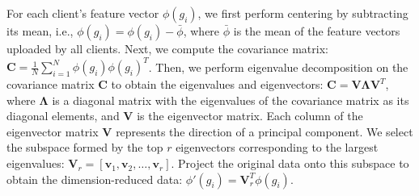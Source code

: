 \documentclass[conference]{IEEEtran}
\begin{document}
















For each client's feature vector $\phi(g_i)$, we first perform centering by subtracting its mean, i.e., $\phi(g_i) = \phi(g_i) - \bar{\phi}$, where $\bar{\phi}$ is the mean of the feature vectors uploaded by all clients. Next, we compute the covariance matrix: $\mathbf{C} = \frac{1}{N} \sum_{i=1}^N \phi(g_i) \phi(g_i)^T$. Then, we perform eigenvalue decomposition on the covariance matrix $\mathbf{C}$ to obtain the eigenvalues and eigenvectors: $\mathbf{C} = \mathbf{V} \mathbf{\Lambda} \mathbf{V}^T$, where $\mathbf{\Lambda}$ is a diagonal matrix with the eigenvalues of the covariance matrix as its diagonal elements, and $\mathbf{V}$ is the eigenvector matrix. Each column of the eigenvector matrix $\mathbf{V}$ represents the direction of a principal component. We select the subspace formed by the top $r$ eigenvectors corresponding to the largest eigenvalues: $\mathbf{V}_r = [\mathbf{v}_1, \mathbf{v}_2, \ldots, \mathbf{v}_r]$. Project the original data onto this subspace to obtain the dimension-reduced data: $\phi'(g_i) = \mathbf{V}_r^T \phi(g_i)$.
\end{document}
